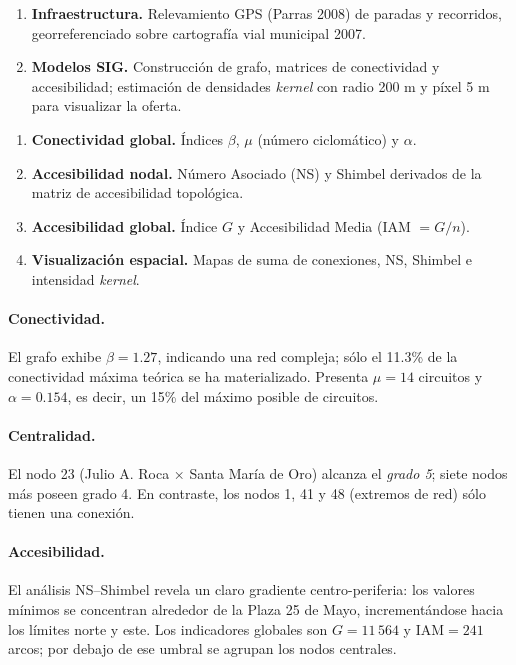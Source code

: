 \documentclass[openany]{book}
\begin{document}
		\begin{enumerate}
		  \item \textbf{Infraestructura.} Relevamiento GPS (Parras 2008) de paradas y recorridos, georreferenciado sobre cartografía vial municipal 2007.
		  \item \textbf{Modelos SIG.} Construcción de grafo, matrices de conectividad y accesibilidad; estimación de densidades \emph{kernel} con radio 200 m y píxel 5 m para visualizar la oferta.
		\end{enumerate}

		\begin{enumerate}
		  \item \textbf{Conectividad global.} Índices $\beta$, $\mu$ (número ciclomático) y $\alpha$.
		  \item \textbf{Accesibilidad nodal.} Número Asociado (NS) y Shimbel derivados de la matriz de accesibilidad topológica.
		  \item \textbf{Accesibilidad global.} Índice $G$ y Accesibilidad Media (IAM $=G/n$).
		  \item \textbf{Visualización espacial.} Mapas de suma de conexiones, NS, Shimbel e intensidad \emph{kernel}.
		\end{enumerate}

		\paragraph{Conectividad.}
		El grafo exhibe $\beta = 1.27$, indicando una red compleja; sólo el 11.3\% de la conectividad máxima teórica se ha materializado. Presenta $\mu = 14$ circuitos y $\alpha = 0.154$, es decir, un 15\% del máximo posible de circuitos.

		\paragraph{Centralidad.}
		El nodo 23 (Julio A. Roca × Santa María de Oro) alcanza el \emph{grado 5}; siete nodos más poseen grado 4. En contraste, los nodos 1, 41 y 48 (extremos de red) sólo tienen una conexión.

		\paragraph{Accesibilidad.}
		El análisis NS–Shimbel revela un claro gradiente centro-periferia: los valores mínimos se concentran alrededor de la Plaza 25 de Mayo, incrementándose hacia los límites norte y este. Los indicadores globales son $G = 11\,564$ y $\mathrm{IAM}=241$ arcos; por debajo de ese umbral se agrupan los nodos centrales.
\end{document}

